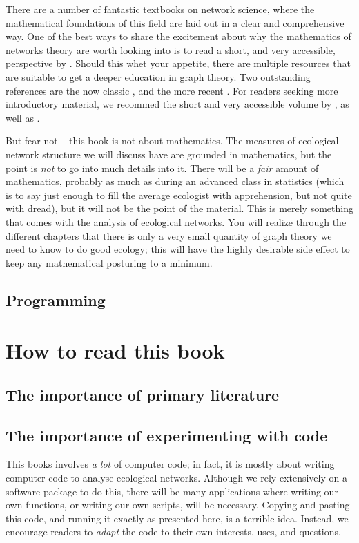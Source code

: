 There are a number of fantastic textbooks on network science, where the
mathematical foundations of this field are laid out in a clear and comprehensive
way. One of the best ways to share the excitement about why the mathematics of
networks theory are worth looking into is to read a short, and very accessible,
perspective by \textcite{Str01}. Should this whet your appetite, there are
multiple resources that are suitable to get a deeper education in graph theory.
Two outstanding references are the now classic \textcite{New10}, and the more
recent \textcite{Bar16}. For readers seeking more introductory material, we
recommed the short and very accessible volume by \textcite{Cha85}, as well as
\textcite{Wes01}.

But fear not -- this book is not about mathematics. The measures of ecological
network structure we will discuss have are grounded in mathematics, but the
point is \emph{not} to go into much details into it. There will be a \emph{fair}
amount of mathematics, probably as much as during an advanced class in
statistics (which is to say just enough to fill the average ecologist with
apprehension, but not quite with dread), but it will not be the point of the
material. This is merely something that comes with the analysis of ecological
networks. You will realize through the different chapters that there is only a
very small quantity of graph theory we need to know to do good ecology; this
will have the highly desirable side effect to keep any mathematical posturing to
a minimum.

\subsection{Programming}

\section{How to read this book}

\subsection{The importance of primary literature}

\subsection{The importance of experimenting with code}

This books involves \emph{a lot} of computer code; in fact, it is mostly about
writing computer code to analyse ecological networks. Although we rely
extensively on a software package \parencite{poisot_ecologicalnetworks.jl_2019}
to do this, there will be many applications where writing our own functions, or
writing our own scripts, will be necessary. Copying and pasting this code, and
running it exactly as presented here, is a terrible idea. Instead, we encourage
readers to \emph{adapt} the code to their own interests, uses, and questions.

